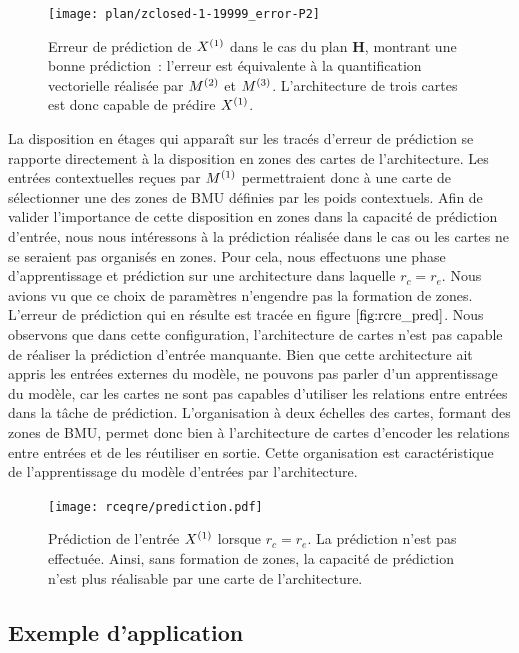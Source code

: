 \documentclass[../main]{subfiles}
\begin{document}
\begin{figure}
	\texttt{[image: plan/zclosed-1-19999\_error-P2]}	
	\caption{Erreur de prédiction de $X^{({1})}$ dans le cas du plan \textbf{H}, montrant une bonne prédiction~: l'erreur est équivalente à la quantification vectorielle réalisée par $M^{({2})}$ et $M^{({3})}$. L'architecture de trois cartes est donc capable de prédire $X^{({1})}$. 
	\label{fig:plan3_pred}}
\end{figure}

La disposition en étages qui apparaît sur les tracés d'erreur de prédiction se rapporte directement à la disposition en zones des cartes de l'architecture.
Les entrées contextuelles reçues par $M^{({1})}$ permettraient donc à une carte de sélectionner une des zones de BMU définies par les poids contextuels.
Afin de valider l'importance de cette disposition en zones dans la capacité de prédiction d'entrée, nous nous intéressons à la prédiction réalisée dans le cas ou les cartes ne se seraient pas organisés en zones.
Pour cela, nous effectuons une phase d'apprentissage et prédiction sur une architecture dans laquelle $r_c = r_e$. 
Nous avions vu que ce choix de paramètres n'engendre pas la formation de zones. L'erreur de prédiction qui en résulte est tracée en figure $\ref{fig:rcre_pred}$.
Nous observons que dans cette configuration, l'architecture de cartes n'est pas capable de réaliser la prédiction d'entrée manquante.
Bien que cette architecture ait appris les entrées externes du modèle, ne pouvons pas parler d'un apprentissage du modèle, car les cartes ne sont pas capables d'utiliser les relations entre entrées dans la tâche de prédiction.
L'organisation à deux échelles des cartes, formant des zones de BMU, permet donc bien à l'architecture de cartes d'encoder les relations entre entrées et de les réutiliser en sortie. Cette organisation est caractéristique de l'apprentissage du modèle d'entrées par l'architecture.

\begin{figure}
	\centering\texttt{[image: rceqre/prediction.pdf]}
	\caption{Prédiction de l'entrée $X^{({1})}$ lorsque $r_c = r_e$. La prédiction n'est pas effectuée. Ainsi, sans formation de zones, la capacité de prédiction n'est plus réalisable par une carte de l'architecture. \label{fig:rcre_pred}}
\end{figure}

\subsection{Exemple d'application}
\end{document}
